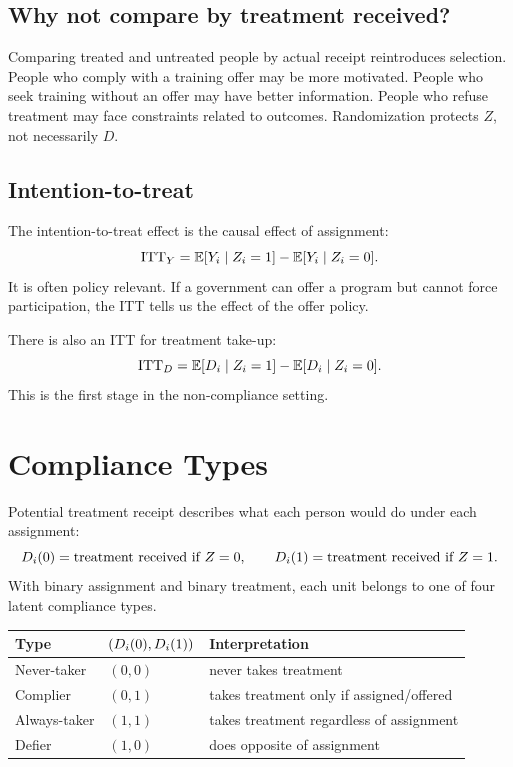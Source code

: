 \subsection{Why not compare by treatment received?}

Comparing treated and untreated people by actual receipt reintroduces selection.
People who comply with a training offer may be more motivated. People who seek
training without an offer may have better information. People who refuse
treatment may face constraints related to outcomes. Randomization protects $Z$,
not necessarily $D$.

\subsection{Intention-to-treat}

The intention-to-treat effect is the causal effect of assignment:
\[
    \mathrm{ITT}_Y
    =
    \mathbb{E}[Y_i \mid Z_i=1] - \mathbb{E}[Y_i \mid Z_i=0].
\]
It is often policy relevant. If a government can offer a program but cannot
force participation, the ITT tells us the effect of the offer policy.

There is also an ITT for treatment take-up:
\[
    \mathrm{ITT}_D
    =
    \mathbb{E}[D_i \mid Z_i=1] - \mathbb{E}[D_i \mid Z_i=0].
\]
This is the first stage in the non-compliance setting.

\section{Compliance Types}

Potential treatment receipt describes what each person would do under each
assignment:
\[
    D_i(0) = \text{treatment received if } Z=0,
    \qquad
    D_i(1) = \text{treatment received if } Z=1.
\]
With binary assignment and binary treatment, each unit belongs to one of four
latent compliance types.

\begin{center}
\begin{tabular}{lll}
\toprule
Type & $(D_i(0),D_i(1))$ & Interpretation \\
\midrule
Never-taker & $(0,0)$ & never takes treatment \\
Complier & $(0,1)$ & takes treatment only if assigned/offered \\
Always-taker & $(1,1)$ & takes treatment regardless of assignment \\
Defier & $(1,0)$ & does opposite of assignment \\
\bottomrule
\end{tabular}
\end{center}

